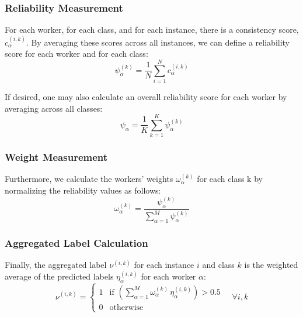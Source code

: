 \subsubsection{Reliability Measurement}
For each worker, for each class, and for each instance, there is a consistency score, $c_{\alpha}^{(i,k)}$. By averaging these scores across all instances, we can define a reliability score for each worker and for each class:
\begin{equation}
    \psi_{\alpha}^{(k)}=\frac{1}{N}\sum_{i=1}^N c_{\alpha}^{(i,k)}\label{eq:crowd.reliability_measurement}
\end{equation}

If desired, one may also calculate an overall reliability score for each worker by averaging across all classes:
\begin{equation}
    \psi_{\alpha}=\frac{1}{K}\sum_{k=1}^K \psi_{\alpha}^{(k)}
\end{equation}

\subsubsection{Weight Measurement}


Furthermore, we calculate the workers' weights $\omega_\alpha^{(k)}$ for each class k by normalizing the reliability values as follows:
\begin{equation}
    \omega_{\alpha}^{(k)}=\frac{\psi_{\alpha}^{(k)}}{\sum_{\alpha=1}^{M} \psi_{\alpha}^{(k)}}
    \label{eq:crowd.eq.11.weights}
\end{equation}

\subsubsection{Aggregated Label Calculation}
Finally, the aggregated label $\nu^{(i,k)}$ for each instance $i $ and class $k $ is the weighted average of the predicted labels $\eta_{\alpha}^{(i,k)} $ for each worker $\alpha $:
\begin{equation}
    \nu^{(i,k)} =
    \begin{cases}
        1 & \text{if } \left(\sum_{\alpha=1}^{M} \omega_{\alpha}^{(k)}\, \eta_{\alpha}^{(i,k)}\right) > 0.5 \\
        0 & \text{otherwise}
    \end{cases}
    \quad \forall i, k
    \label{eq:crowd.aggregated_label}
\end{equation}

